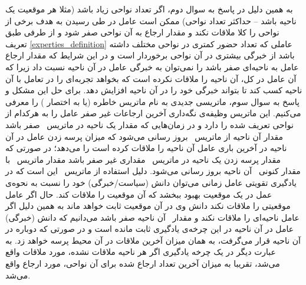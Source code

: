 به همین دلیل در پاسخ به سوال دوم، اگر تعداد نواحی زیاد باشد (مثلا هر موقعیت یک ناحیه باشد -- حداکثر تعداد نواحی) ممکن است عامل در طی رسیدن به هدف برخی از نواحی را کلا ملاقات نکند و مقدار ارجاع به آن نواحی صفر شود و از طرفی طبق تعریف \ref{experties_definition} عاملی که تعداد حضور کمتری در نواحی مختلف داشته باشد از خبرگی بیشتری در آن نواحی برخوردار است و در این شرایط که مقدار ارجاع عامل به ناحیه‌ای صفر باشد را نمی‌توان به خبرگی عامل در آن ناحیه نسبت داد زیرا که آن عامل در کل، آن ناحیه را ملاقات نکرده است که بخواهد تجربه‌ای را در تعامل با آن ناحیه کسب کند تا بتواند خبرگی خود را در آن ناحیه افزایش دهد. برای حل این مشکل و پاسخ به سوال سوم، ماتریسی جدیدی به نام ماتریس خاطره (یا به اختصار ) را معرفی می‌کنیم. این ماتریس وظیفه‌ی نگه‌داری آخرین ارجاعات غیر صفر عامل را به هرکدام از نواحی تعریف شده را دارد و در زمان‌هایی که مقدار یک ناحیه در ماتریس \ صفر باشد مقدار آن ناحیه از ماتریس \ بروز رسانی می‌شود که میزان پرسه زدن عامل در آن ناحیه در آخرین باری عامل آن ناحیه را ملاقات کرده است را می‌دهد؛ در صورتی که مقدار پرسه زدن یک ناحیه در ماتریس \ مقداری غیر صفر باشد مقدار ماتریس \ با مقدار کنونی \ آن ناحیه بروز رسانی می‌شود.
دلیل استفاده از ماتریس \ این است که در یادگیری تقویتی عامل زمانی می‌توان دانش (سیاست/خبرگی) خود را نسبت به نحوه‌ی عمل در یک موقعیت بهبود ببخشد که آن موقعیت را ملاقات کند. حال اگر عامل موقعیتی را ملاقات نکند دانش وی در آن موقعیت ثابت خواهد ماند به همین دلیل اگر عامل ناحیه‌ای را ملاقات نکند و مقدار \ آن ناحیه صفر باشد می‌دانیم که دانش (خبرگی) عامل در آن ناحیه در این چرخه‌ی یادگیری ثابت مانده است و در صورتی که دوباره در آن ناحیه قرار می‌گرفت،  به همان میزان آخرین ملاقات در آن محیط پرسه خواهد زد. به عبارت دیگر در یک چرخه یادگیری اگر هر ناحیه ملاقات نشده، مورد ملاقات واقع می‌شد، تقریبا به میزان آخرین تعداد ارجاع شده برای آن نواحی، مورد ارجاع واقع می‌شد.